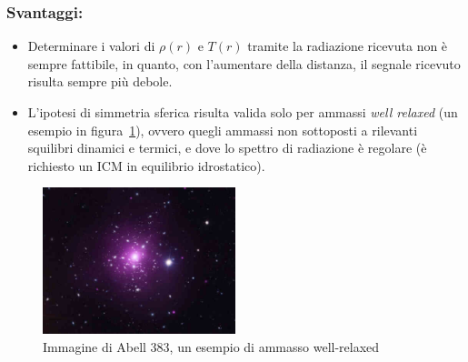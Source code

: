 \subsubsection{\textbf{Svantaggi:}} 
\begin{itemize}
    \item Determinare i valori di $\rho(r)$ e $T(r)$ tramite la radiazione ricevuta non è sempre fattibile, in quanto, con l’aumentare della distanza, il segnale ricevuto risulta sempre più debole. 
    \item L’ipotesi di simmetria sferica risulta valida solo per ammassi \emph{well relaxed} (un esempio in figura~\ref{fig:well-relaxed-cluster}), ovvero quegli ammassi non sottoposti a rilevanti squilibri dinamici e termici, e dove lo spettro di radiazione è regolare (è richiesto un ICM in equilibrio idrostatico).
\end{itemize}
\begin{figure}
    \centering
    \includegraphics[width = 0.5\textwidth]{immagini/relaxed-cluster.jpg}
    \caption{Immagine di Abell 383, un esempio di ammasso well-relaxed}
    \label{fig:well-relaxed-cluster}
\end{figure}
